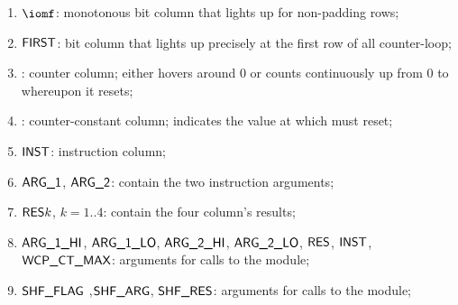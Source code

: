 \begin{enumerate}
    \item $\iomf$:
	monotonous bit column that lights up for non-padding rows;
    \item $\textsf{FIRST}$:
	bit column that lights up precisely at the first row of all counter-loop;
    \item \ct{}:
	counter column; 
	either hovers around $0$ or counts continuously up from $0$ to \maxCt{} whereupon it resets;
    \item \maxCt:
	counter-constant column;
	indicates the value at which \ct{} must reset;
    \item
	\godGiven{}
	$\textsf{INST}{}$:
	instruction column;
    \item
	\godGiven{}
	$\textsf{ARG}\textsf{\_1}$, $\textsf{ARG}\textsf{\_2}$:
	contain the two instruction arguments;
    \item $\textsf{RES}{k}$, $k=1..4$:
	contain the four column's results;
    \item $\textsf{ARG}\textsf{\_1}\textsf{\_HI}$, $\textsf{ARG}\textsf{\_1}\textsf{\_LO}$, $\textsf{ARG}\textsf{\_2}\textsf{\_HI}$, $\textsf{ARG}\textsf{\_2}\textsf{\_LO}$, $\textsf{RES}$, $\textsf{INST}$, $\textsf{WCP\_CT\_MAX}$:
	arguments for calls to the \wcpMod{} module;
    \item $\textsf{SHF\_FLAG}$ ,$\textsf{SHF\_ARG}$, $\textsf{SHF\_RES}$:
	arguments for calls to the \shfMod{} module;
\end{enumerate}
